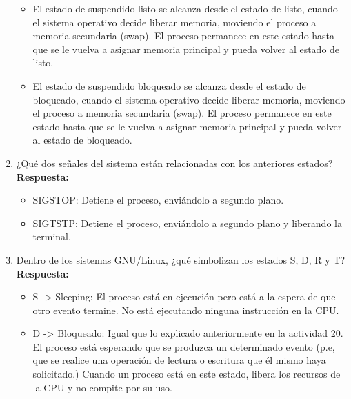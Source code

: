 \documentclass[a4paper,12pt]{article}
\begin{document}
\begin{enumerate}[label=\textbf{Pregunta \arabic*.}]
\begin{itemize}
    \item El estado de suspendido listo se alcanza desde el estado de listo, cuando el sistema operativo decide liberar memoria, moviendo el proceso a memoria secundaria (swap). El proceso permanece en este estado hasta que se le vuelva a asignar memoria principal y pueda volver al estado de listo.

    \item El estado de suspendido bloqueado se alcanza desde el estado de bloqueado, cuando el sistema operativo decide liberar memoria, moviendo el proceso a memoria secundaria (swap). El proceso permanece en este estado hasta que se le vuelva a asignar memoria principal y pueda volver al estado de bloqueado.

    \end{itemize}


    \item ¿Qué dos señales del sistema están relacionadas con los anteriores estados? \\ %
    \textbf{Respuesta:} 
    
    \begin{itemize}
        \item SIGSTOP: Detiene el proceso, enviándolo a segundo plano.
        \item SIGTSTP: Detiene el proceso, enviándolo a segundo plano y liberando la terminal.
    \end{itemize}


    \item Dentro de los sistemas GNU/Linux, ¿qué simbolizan los estados S, D, R y T? \\ %
    \textbf{Respuesta:} 
    
    \begin{itemize}
        \item S -> Sleeping: El proceso está en ejecución pero está a la espera de que otro evento termine. No está ejecutando ninguna instrucción en la CPU.

        \item D -> Bloqueado: Igual que lo explicado anteriormente en la actividad 20. El proceso está esperando que se produzca un determinado evento (p.e, que se realice una operación de lectura o escritura que él mismo haya solicitado.) Cuando un proceso está en este estado, libera los recursos de la CPU y no compite por su uso.

    \end{itemize}



\end{enumerate}
\end{document}
